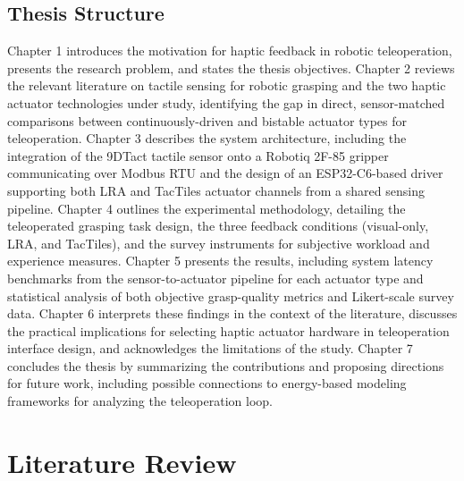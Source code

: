 \documentclass[12pt, a4paper]{report}
\begin{document}
\section{Thesis Structure}
Chapter 1 introduces the motivation for haptic feedback in robotic teleoperation, presents the research problem, and states the thesis objectives. Chapter 2 reviews the relevant literature on tactile sensing for robotic grasping and the two haptic actuator technologies under study, identifying the gap in direct, sensor-matched comparisons between continuously-driven and bistable actuator types for teleoperation. Chapter 3 describes the system architecture, including the integration of the 9DTact tactile sensor onto a Robotiq 2F-85 gripper communicating over Modbus RTU and the design of an ESP32-C6-based driver supporting both LRA and TacTiles actuator channels from a shared sensing pipeline. Chapter 4 outlines the experimental methodology, detailing the teleoperated grasping task design, the three feedback conditions (visual-only, LRA, and TacTiles), and the survey instruments for subjective workload and experience measures. Chapter 5 presents the results, including system latency benchmarks from the sensor-to-actuator pipeline for each actuator type and statistical analysis of both objective grasp-quality metrics and Likert-scale survey data. Chapter 6 interprets these findings in the context of the literature, discusses the practical implications for selecting haptic actuator hardware in teleoperation interface design, and acknowledges the limitations of the study. Chapter 7 concludes the thesis by summarizing the contributions and proposing directions for future work, including possible connections to energy-based modeling frameworks for analyzing the teleoperation loop.

\chapter{Literature Review}
\end{document}
